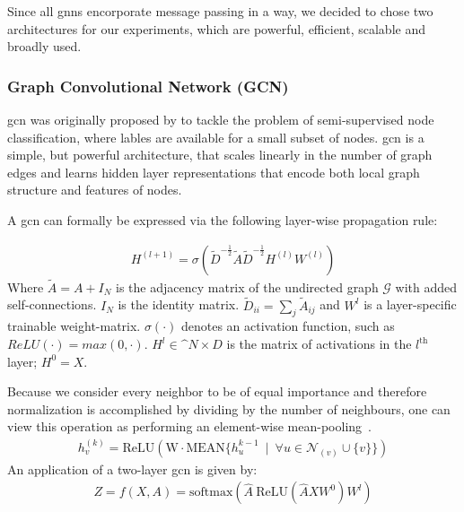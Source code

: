 Since all \acp{gnn} encorporate message passing in a way, we decided to chose two architectures for our experiments, which are powerful, efficient, scalable and broadly used.
\subsubsection{Graph Convolutional Network (GCN)}
\label{sec:related:architectures:gcn}
\Acf{gcn} was originally proposed by \citet{Kipf2017} to tackle the problem of semi-supervised node classification, where lables are available for a small subset of nodes. \ac{gcn} is a simple, but powerful architecture, that scales linearly in the number of graph
edges and learns hidden layer representations that encode both local graph structure and features of nodes.

A \ac{gcn} can formally be expressed via the following layer-wise propagation rule:

\begin{align*}
    H^{(l+1)} = \sigma (\tilde{D}^{-\frac{1}{2}}\tilde{A}\tilde{D}^{-\frac{1}{2}} H^{(l)}W^{(l)})
\end{align*}
Where $\tilde{A} = A + I_{N}$ is the adjacency matrix of the undirected graph $\mathcal{G}$
with added self-connections. $I_{N}$ is the identity matrix. $\tilde{D}_{ii} = \sum_{j}\tilde{A}_{ij}$ and $W^{l}$ is a layer-specific trainable weight-matrix. $\sigma(\cdot)$ denotes an activation function, such as $ReLU(\cdot) = max(0, \cdot)$. $ H^{l}\in  \mathbb^{N \times D}$ is the matrix of activations in the
$l^{\mathrm{th}}$ layer; $H^{0}= X$.

Because we consider every neighbor to be of equal importance and therefore normalization is accomplished
by dividing by the number of neighbours, one can view this operation as performing an element-wise
mean-pooling~\cite{Xu2019}.
\begin{align*}
    h_{v}^{(k)} = \mathrm{ReLU}(\mathrm{W} \cdot\mathrm{MEAN} \{h_{u}^{k-1}\ \mid \ \forall{u} \in \mathcal{N}_{(v)} \cup \{v\}\})
\end{align*}
An application of a two-layer \ac{gcn} is given by:
\begin{align*}
    Z = f(X,A) = \mathrm{softmax} (\hat{A}\ \mathrm{ReLU}(\hat{A}XW^{0})W^{l})
\end{align*}

